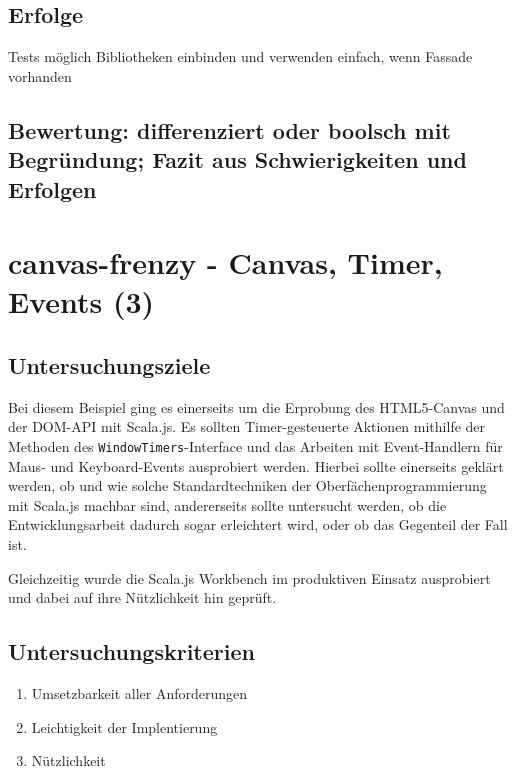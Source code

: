 \documentclass[a4paper, 12pt, hidelinks, listof=totoc, listoftables=totoc, bibliography=totoc]{scrreprt}
\begin{document}
\subsection{Erfolge}
Tests möglich
Bibliotheken einbinden und verwenden einfach, wenn Fassade vorhanden
\subsection{Bewertung: differenziert oder boolsch mit Begründung; Fazit aus Schwierigkeiten und Erfolgen}












\section{canvas-frenzy - Canvas, Timer, Events (3)}

\subsection{Untersuchungsziele}

Bei diesem Beispiel ging es einerseits um die Erprobung des HTML5-Canvas und der DOM-API mit Scala.js. Es sollten Timer-gesteuerte Aktionen mithilfe der Methoden des \texttt{WindowTimers}-Interface und das Arbeiten mit Event-Handlern für Maus- und Keyboard-Events ausprobiert werden. Hierbei sollte einerseits geklärt werden, ob und wie solche Standardtechniken der Oberfächenprogrammierung mit Scala.js machbar sind, andererseits sollte untersucht werden, ob die Entwicklungsarbeit dadurch sogar erleichtert wird, oder ob das Gegenteil der Fall ist.

Gleichzeitig wurde die Scala.js Workbench im produktiven Einsatz ausprobiert und dabei auf ihre Nützlichkeit hin geprüft.

\subsection{Untersuchungskriterien}

\begin{enumerate}
	\item Umsetzbarkeit aller Anforderungen
	\item Leichtigkeit der Implentierung
	\item Nützlichkeit
\end{enumerate}
\end{document}
